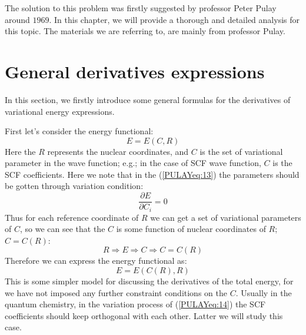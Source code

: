The solution to this problem was firstly suggested by professor Peter
Pulay around $1969$. In this chapter, we will provide a thorough and
detailed analysis for this topic. The materials we are referring to,
are mainly from professor Pulay\cite{Pulay1, Pulay2, Pulay3, Pulay4,
  Pulay5}.

\section{General derivatives expressions}
%
%
In this section, we firstly introduce some general formulas for the
derivatives of variational energy expressions.

First let's consider the energy functional:
\begin{equation}\label{PULAYeq:13}
  E = E(C,R)
\end{equation}
Here the $R$ represents the nuclear coordinates, and $C$ is the set of
variational parameter in the wave function; e.g.; in the case of SCF
wave function, $C$ is the SCF coefficients. Here we note that in the
(\ref{PULAYeq:13}) the parameters should be gotten through variation
condition:
\begin{equation}\label{PULAYeq:14}
  \frac{\partial E}{\partial C_{i}} = 0
\end{equation}
Thus for each reference coordinate of $R$ we can get a set of
variational parameters of $C$, so we can see that the $C$ is some
function of nuclear coordinates of $R$; $C = C(R)$:
\begin{equation}\label{}
  R \Rightarrow E \Rightarrow C \Rightarrow C= C(R)
\end{equation}
Therefore we can express the energy functional as:
\begin{equation}\label{PULAYeq:2}
  E = E(C(R), R)
\end{equation}
This is some simpler model for discussing the derivatives of the total
energy, for we have not imposed any further constraint conditions on
the $C$. Usually in the quantum chemistry, in the variation process of
(\ref{PULAYeq:14}) the SCF coefficients should keep orthogonal with
each other. Latter we will study this case.

